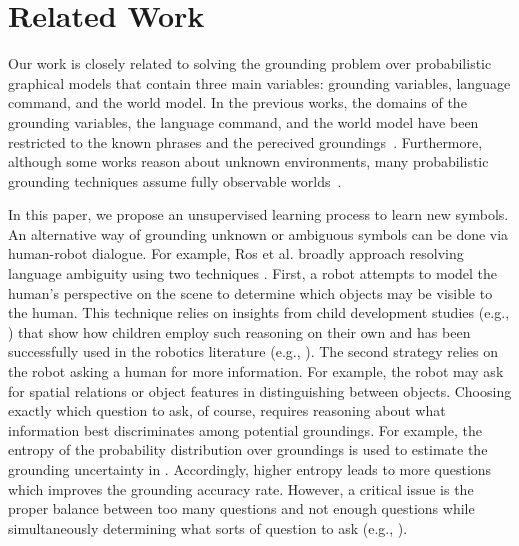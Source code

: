 \section{Related Work}
\label{sec:related}
Our work is closely related to solving the grounding problem over probabilistic graphical models that contain three main variables: grounding variables, language command, and the world model.
In the previous works, the domains of the grounding variables, the language command, and the world model have been restricted to the known phrases and the perecived groundings~\cite{g3,dcg}.
Furthermore, although some works reason about unknown environments, many probabilistic grounding techniques assume fully observable worlds~\cite{citeLangNoisySensor,outside1}.

In this paper, we propose an unsupervised learning process to learn new symbols. An alternative way of grounding unknown or ambiguous symbols can be done via human-robot dialogue. For example, Ros et al. broadly approach resolving language ambiguity using two techniques \cite{whichOne}. First, a robot attempts to model the human's perspective on the scene to determine which objects may be visible to the human.
This technique relies on insights from child development studies (e.g., \cite{kids1}) that show how children employ such reasoning on their own and has been successfully used in the robotics literature (e.g., \cite{perspective1,perspective2}).
The second strategy relies on the robot asking a human for more information.
For example, the robot may ask for spatial relations or object features in distinguishing between objects.
Choosing exactly which question to ask, of course, requires reasoning about what information best discriminates among potential groundings. %
For example, the entropy of the probability distribution over groundings is used to estimate the grounding uncertainty in \cite{clarifyingCommands}. Accordingly, higher entropy leads to more questions which improves the grounding accuracy rate.
However, a critical issue is the proper balance between too many questions and not enough questions while simultaneously determining what sorts of question to ask (e.g., \cite{interaction1,interaction2}).

